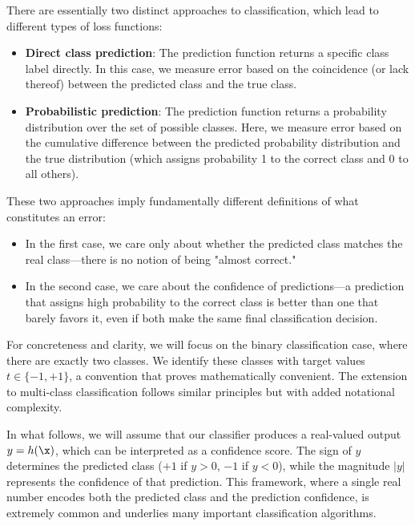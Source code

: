 There are essentially two distinct approaches to classification, which lead to different types of loss functions:

\begin{itemize}
\item \textbf{Direct class prediction}: The prediction function returns a specific class label directly. In this case, we measure error based on the coincidence (or lack thereof) between the predicted class and the true class.

\item \textbf{Probabilistic prediction}: The prediction function returns a probability distribution over the set of possible classes. Here, we measure error based on the cumulative difference between the predicted probability distribution and the true distribution (which assigns probability 1 to the correct class and 0 to all others).
\end{itemize}

These two approaches imply fundamentally different definitions of what constitutes an error:
\begin{itemize}
\item In the first case, we care only about whether the predicted class matches the real class—there is no notion of being "almost correct."
\item In the second case, we care about the confidence of predictions—a prediction that assigns high probability to the correct class is better than one that barely favors it, even if both make the same final classification decision.
\end{itemize}

For concreteness and clarity, we will focus on the \alert{binary classification} case, where there are exactly two classes. We identify these classes with target values $t \in \{-1, +1\}$, a convention that proves mathematically convenient. The extension to multi-class classification follows similar principles but with added notational complexity.

In what follows, we will assume that our classifier produces a real-valued output $y = h(\x)$, which can be interpreted as a confidence score. The sign of $y$ determines the predicted class ($+1$ if $y > 0$, $-1$ if $y < 0$), while the magnitude $|y|$ represents the confidence of that prediction. This framework, where a single real number encodes both the predicted class and the prediction confidence, is extremely common and underlies many important classification algorithms.

